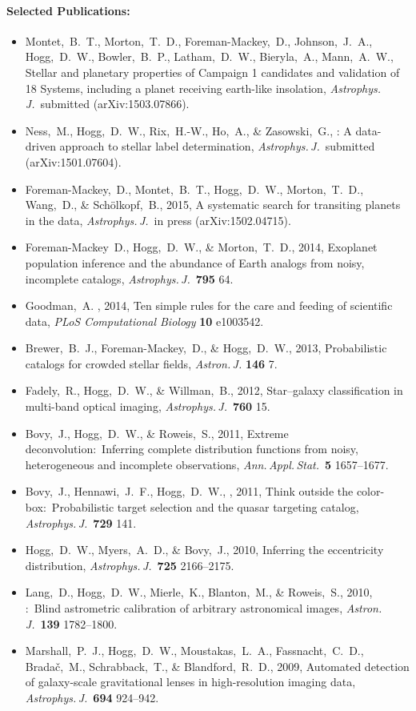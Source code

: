 \documentclass[12pt]{article}
\begin{document}
\paragraph{Selected Publications:}
\begin{itemize}\setlength{\itemsep}{0pt}
\item
Montet,~B.~T., Morton,~T.~D., Foreman-Mackey,~D., Johnson,~J.~A.,
Hogg,~D.~W., Bowler,~B.~P., Latham,~D.~W., Bieryla,~A., Mann,~A.~W.,
{Stellar and planetary properties of  Campaign 1
  candidates and validation of 18 Systems, including a planet
  receiving earth-like insolation},
\textit{Astrophys.\,J.}\ submitted (arXiv:1503.07866).
\item
Ness,~M., Hogg,~D.~W., Rix,~H.-W., Ho,~A., \& Zasowski,~G.,
{: A data-driven approach to stellar label determination},
\textit{Astrophys.\,J.}\ submitted (arXiv:1501.07604).
\item
Foreman-Mackey,~D., Montet,~B.~T., Hogg,~D.~W., Morton,~T.~D., Wang,~D., \& Sch\"olkopf,~B., 2015,
{A systematic search for transiting planets in the  data},
\textit{Astrophys.\,J.}\ in press (arXiv:1502.04715).
\item
Foreman-Mackey~D., Hogg,~D.~W., \& Morton,~T.~D., 2014,
{Exoplanet population inference and the abundance of Earth analogs from noisy, incomplete catalogs},
\textit{Astrophys.\,J.}\ \textbf{795} 64.
\item
Goodman,~A. \etal, 2014,
{Ten simple rules for the care and feeding of scientific data},
\textit{PLoS Computational Biology} \textbf{10} e1003542.
\item
Brewer,~B.~J., Foreman-Mackey,~D., \& Hogg,~D.~W., 2013,
{Probabilistic catalogs for crowded stellar fields},
\textit{Astron.\,J.} \textbf{146} 7.
\item
Fadely,~R., Hogg,~D.~W., \& Willman,~B., 2012,
{Star--galaxy classification in multi-band optical imaging},
\textit{Astrophys.\,J.}\ \textbf{760} 15.
\item
Bovy,~J., Hogg,~D.~W., \& Roweis,~S., 2011,
{Extreme deconvolution:\ Inferring complete distribution functions from noisy, heterogeneous and incomplete observations},
\textit{Ann.\,Appl.\,Stat.}\ \textbf{5} 1657--1677.
\item
Bovy,~J., Hennawi,~J.~F., Hogg,~D.~W., \etal, 2011,
{Think outside the color-box:\ Probabilistic target selection and the  quasar targeting catalog},
\textit{Astrophys.\,J.}\ \textbf{729} 141.
\item
Hogg,~D.~W., Myers,~A.~D., \& Bovy,~J., 2010,
{Inferring the eccentricity distribution},
\textit{Astrophys.\,J.}\ \textbf{725} 2166--2175.
\item
Lang,~D., Hogg,~D.~W., Mierle,~K., Blanton,~M., \& Roweis,~S., 2010,
{:\ Blind astrometric calibration of arbitrary astronomical images},
\textit{Astron.\,J.}\ \textbf{139} 1782--1800.
\item
Marshall,~P.~J., Hogg,~D.~W., Moustakas,~L.~A., Fassnacht,~C.~D.,
Brada\v{c},~M., Schrabback,~T., \& Blandford,~R.~D., 2009,
{Automated detection of galaxy-scale gravitational lenses in high-resolution imaging data},
\textit{Astrophys.\,J.}\ \textbf{694} 924--942.
\end{itemize}
\end{document}
